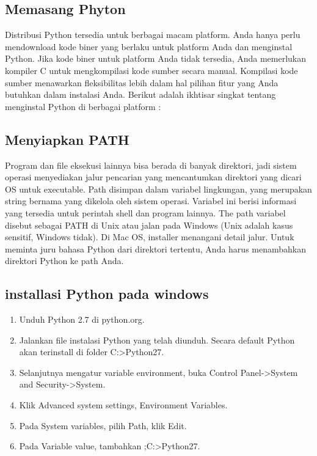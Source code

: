 \subsection{Memasang Phyton}
Distribusi Python tersedia untuk berbagai macam platform. Anda hanya perlu mendownload kode biner yang berlaku untuk platform 
Anda dan menginstal Python.
Jika kode biner untuk platform Anda tidak tersedia, Anda memerlukan kompiler C untuk mengkompilasi kode sumber secara manual. 
Kompilasi kode sumber menawarkan fleksibilitas lebih dalam hal pilihan fitur yang Anda butuhkan dalam instalasi Anda.
Berikut adalah ikhtisar singkat tentang menginstal Python di berbagai platform :

\subsection{Menyiapkan PATH}
Program dan file eksekusi lainnya bisa berada di banyak direktori, 
jadi sistem operasi menyediakan jalur pencarian yang mencantumkan direktori yang dicari OS untuk executable.
Path disimpan dalam variabel lingkungan, yang merupakan string bernama yang dikelola oleh sistem operasi. 
Variabel ini berisi informasi yang tersedia untuk perintah shell dan program lainnya.
The path variabel disebut sebagai PATH di Unix atau jalan pada Windows (Unix adalah kasus sensitif, Windows tidak).
Di Mac OS, installer menangani detail jalur. Untuk meminta juru bahasa Python dari direktori tertentu, 
Anda harus menambahkan direktori Python ke path Anda.

\subsection{installasi Python pada windows}
	\begin{enumerate}
	\item Unduh Python 2.7 di python.org.
	\item Jalankan file instalasi Python yang telah diunduh. Secara default Python akan terinstall di folder C:>Python27.
	\item Selanjutnya mengatur variable environment, buka Control Panel->System and Security->System.
	\item Klik Advanced system settings, Environment Variables.
	\item Pada System variables, pilih Path, klik Edit.
	\item Pada Variable value, tambahkan ;C:>Python27.
	\end{enumerate}
	
